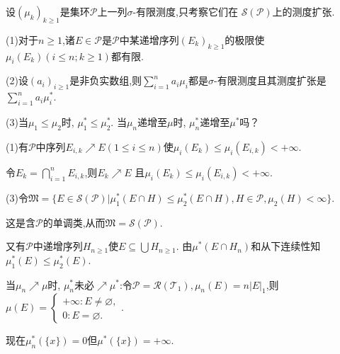 \begin{4}
设$(\mu_k)_{k\geqslant1}$是集环$\mathcal{P}$上一列$\sigma$-有限测度,只考察它们在 $\mathcal{S}(\mathcal{P})$上的测度扩张. 

(1)对于$n\geqslant1$,诸$E\in\mathcal{P}$是$\mathcal{P}$中某递增序列$(E_k)_{k\geqslant1}$的极限使$\mu_i(E_k)(i\leqslant n;k\geqslant1)$都有限.

(2)设$(a_i)_{i\geqslant1}$是非负实数组,则$\sum\limits_{i=1}^na_i\mu_i$都是$\sigma$-有限测度且其测度扩张是$\sum\limits_{i=1}^na_i\mu_i^*$.

(3)当$\mu_1\leqslant\mu_{2}$时, $\mu_1^*\leqslant\mu_{2}^*$. 
当$\mu_n$递增至$\mu$时, $\mu_n^*$递增至$\mu^*$吗？
\end{4}   
\begin{solution}
(1)有$\mathcal{P}$中序列$E_{i,k}\nearrow E(1\leqslant i\leqslant n)$使$\mu_i(E_k)\leqslant\mu_i(E_{i,k})<+\infty$.

令$E_k=\bigcap\limits_{i=1}^nE_{i,k}$,则$E_k\nearrow E$
且$\mu_i(E_k)\leqslant\mu_i(E_{i,k})<+\infty$.

(3)令$\mathfrak{M}=\{E\in\mathcal{S}(\mathcal{P})|\mu_1^*(E\cap H)\leqslant\mu^*_2(E\cap H),H\in\mathcal{P},\mu_2(H)<\infty\}$.

这是含$\mathcal{P}$的单调类,从而$\mathfrak{M}=\mathcal{S}(\mathcal{P})$.

又有$\mathcal{P}$中递增序列$H_{n\geqslant1}$使$E\subseteq\bigcup H_{n\geqslant1}$. 
由$\mu^*(E\cap H_n)$和从下连续性知$\mu_1^*(E)\leqslant\mu_2^*(E)$.

当$\mu_n\nearrow\mu$时, $\mu_n^*$未必$\nearrow\mu^*$:令$\mathcal{P}=\mathcal{R}(\mathcal{T_1}),\mu_n(E)=n|E|_1$,则$\mu(E)=\begin{cases}
    +\infty:E\neq\varnothing,\\
    0:E=\varnothing.
\end{cases}$.

现在$\mu_n^*(\{x\})=0$但$\mu^*(\{x\})=+\infty$.
\end{solution}


